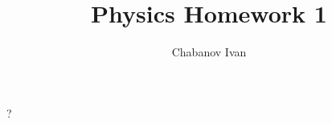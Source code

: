 \begin{titlepage}
    \title{Physics Homework 1}
    \author{Chabanov Ivan}
    \maketitle

    ?
\end{titlepage}